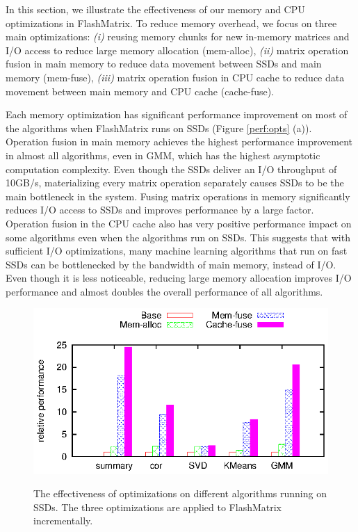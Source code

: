 In this section, we illustrate the effectiveness of our memory and CPU
optimizations in FlashMatrix. To reduce memory overhead, we focus on three
main optimizations: \textit{(i)} reusing memory chunks for new in-memory
matrices and I/O access to reduce large memory allocation (mem-alloc),
\textit{(ii)} matrix operation fusion in main memory to reduce data movement
between SSDs and main memory (mem-fuse), \textit{(iii)} matrix operation
fusion in CPU cache to reduce data movement between main memory and CPU cache
(cache-fuse).

Each memory optimization has significant performance improvement on most of
the algorithms when FlashMatrix runs on SSDs (Figure \ref{perf:opts} (a)).
Operation fusion in main memory achieves
the highest performance improvement in almost all algorithms, even in GMM,
which has the highest asymptotic computation complexity. Even though the SSDs
deliver an I/O throughput of 10GB/s, materializing every matrix operation
separately causes SSDs to be the main bottleneck in the system.
Fusing matrix operations in memory significantly reduces I/O access to SSDs and
improves performance by a large factor. Operation fusion in the CPU cache also
has very positive performance impact on some algorithms even when
the algorithms run on SSDs. This suggests that with sufficient I/O optimizations,
many machine learning algorithms that run on fast SSDs can be bottlenecked by
the bandwidth of main memory, instead of I/O. Even though it is less noticeable,
reducing large memory allocation improves I/O performance and almost doubles
the overall performance of all algorithms.

\begin{figure}
	\begin{center}
		\footnotesize
		\includegraphics{FlashMatrix_figs/opts-EM.eps}
		\label{perf:em_opts}
		\caption{The effectiveness of optimizations on different algorithms
		running on SSDs. The three optimizations are applied to FlashMatrix
		incrementally.}
	\end{center}
\end{figure}

